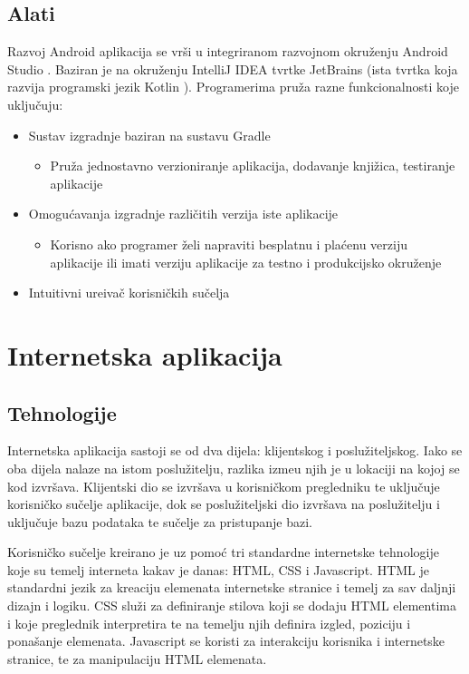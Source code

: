\subsection{Alati}
Razvoj Android aplikacija se vr\v{s}i u integriranom razvojnom okru\v{z}enju Android Studio \cite{androidStudio}. Baziran je na okru\v{z}enju IntelliJ IDEA \cite{inteliJ} tvrtke JetBrains (ista tvrtka koja razvija programski jezik Kotlin \cite{kotlin}). Programerima pru\v{z}a razne funkcionalnosti koje uklju\v{c}uju:

\begin{itemize}
		\item Sustav izgradnje baziran na sustavu Gradle \cite{gradle}
		\begin{itemize}
			\item Pru\v{z}a jednostavno verzioniranje aplikacija, dodavanje knji\v{z}ica, testiranje aplikacije
		\end{itemize}
		\item Omogu\'{c}avanja izgradnje razli\v{c}itih verzija iste aplikacije
		\begin{itemize}
			\item Korisno ako programer \v{z}eli napraviti besplatnu i pla\'{c}enu verziju aplikacije ili imati verziju aplikacije za testno i produkcijsko okru\v{z}enje
		\end{itemize}
		\item Intuitivni ure\dj iva\v{c} korisni\v{c}kih su\v{c}elja
	\end{itemize}


\section{Internetska aplikacija}

\subsection{Tehnologije}

Internetska aplikacija sastoji se od dva dijela: klijentskog i poslu\v{z}iteljskog. Iako se oba dijela nalaze na istom poslu\v{z}itelju, razlika izme\dj u njih je u lokaciji na kojoj se kod izvr\v{s}ava. Klijentski dio se izvr\v{s}ava u korisni\v{c}kom pregledniku te uklju\v{c}uje korisni\v{c}ko su\v{c}elje aplikacije, dok se poslu\v{z}iteljski dio izvr\v{s}ava na poslu\v{z}itelju i uklju\v{c}uje bazu podataka te su\v{c}elje za pristupanje bazi.

Korisni\v{c}ko su\v{c}elje kreirano je uz pomo\'{c} tri standardne internetske tehnologije koje su temelj interneta kakav je danas: HTML, CSS i Javascript. HTML \cite{html} je standardni jezik za kreaciju elemenata internetske stranice i temelj za sav daljnji dizajn i logiku. CSS \cite{css} slu\v{z}i za definiranje stilova koji se dodaju HTML elementima i koje preglednik interpretira te na temelju njih definira izgled, poziciju i pona\v{s}anje elemenata. Javascript \cite{javascript} se koristi za interakciju korisnika i internetske stranice, te za manipulaciju HTML elemenata.

